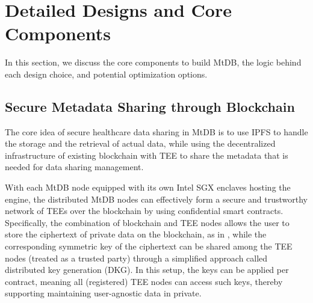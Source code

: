 \documentclass[conference]{IEEEtran}
\newcommand{\wenyi}[1]{ {\color{blue}{#1}}}
\newcommand{\ours}{\xspace MtDB\xspace}
\begin{document}




\section{Detailed Designs and Core Components}
In this section, we discuss the core components to build \ours, the logic behind each design choice, and potential optimization options.


\subsection{Secure Metadata Sharing through Blockchain}
The core idea of secure healthcare data sharing in \ours is to use 
IPFS to handle the storage and the retrieval of actual data, while using the decentralized infrastructure of existing blockchain with TEE to share the metadata that is needed for data sharing management. 

With each \ours node equipped with its own Intel SGX enclaves hosting the engine, the distributed \ours nodes can effectively form a secure 
and trustworthy 
network of TEEs over the blockchain by using confidential smart contracts. Specifically, the combination of blockchain and TEE nodes allows the user to store the ciphertext of private data on the blockchain, as in \cite{bowman2018private, yuan2018shadoweth, cheng2019ekiden}, while the corresponding symmetric key of the ciphertext can be shared among the TEE nodes (treated as a trusted party) through a simplified approach called
distributed key generation (DKG).
In this setup, the keys can be applied per contract, meaning all (registered) TEE nodes can access such keys, thereby supporting maintaining user-agnostic data in private.
\end{document}
